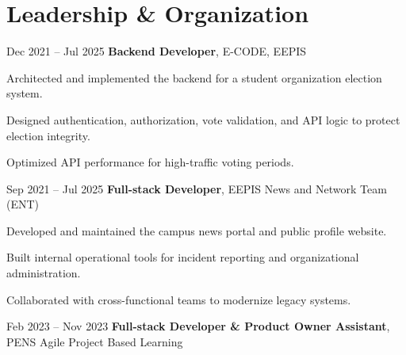 \section{Leadership \& Organization}

\begin{twocolentrydate}{Dec 2021 -- Jul 2025}
	\textbf{Backend Developer}, E-CODE, EEPIS
\end{twocolentrydate}

\vspace{0.10 cm}


\begin{onecolentry}
	\begin{highlights}
		\item Architected and implemented the backend for a student organization election system.
		\item Designed authentication, authorization, vote validation, and API logic to protect election integrity.
		\item Optimized API performance for high-traffic voting periods.
	\end{highlights}
\end{onecolentry}

\vspace{0.5 cm}


\begin{twocolentrydate}{Sep 2021 -- Jul 2025}
	\textbf{Full-stack Developer}, EEPIS News and Network Team (ENT)
\end{twocolentrydate}

\vspace{0.10 cm}


\begin{onecolentry}
	\begin{highlights}
		\item Developed and maintained the campus news portal and public profile website.
		\item Built internal operational tools for incident reporting and organizational administration.
		\item Collaborated with cross-functional teams to modernize legacy systems.
	\end{highlights}
\end{onecolentry}

\vspace{0.5 cm}


\begin{twocolentrydate}{Feb 2023 -- Nov 2023}
	\textbf{Full-stack Developer \& Product Owner Assistant}, PENS Agile Project Based Learning
\end{twocolentrydate}

